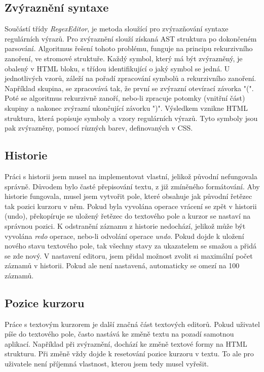 \subsection*{Zvýraznění syntaxe}

Součástí třídy \textit{RegexEditor}, je metoda sloužící pro zvýrazňování syntaxe regulárních výrazů. 
Pro zvýraznění slouží získaná AST struktura po dokončeném parsování.
Algoritmus řešení tohoto problému, funguje na principu rekurzivního zanoření, ve stromové struktuře.
Každý symbol, který má být zvýrazněný, je obalený v HTML bloku, s třídou identifikující o jaký symbol se jedná.
U jednotlivých vzorů, záleží na pořadí zpracování symbolů a rekurzivního zanoření.
Například skupina, se zpracovává tak, že první se zvýrazní otevírací závorka "(".
Poté se algoritmus rekurzivně zanoří, nebo-li zpracuje potomky (vnitřní část) skupiny a nakonec zvýrazní ukončující závorku ")".
Výsledkem vznikne HTML struktura, která popisuje symboly a vzory regulárních výrazů.
Tyto symboly jsou pak zvýrazněny, pomocí různých barev, definovaných v CSS.

\subsection*{Historie}
Práci s historii jsem musel na implementovat vlastní, jelikož původní nefungovala správně.
Důvodem bylo časté přepisování textu, z již zmíněného formátování.
Aby historie fungovala, musel jsem vytvořit pole, které obsahuje jak původní řetězec tak pozici kurzoru v něm.
Pokud byla vyvolána operace vrácení se zpět v historii (undo), překopíruje se uložený řetězec do textového pole a kurzor se nastaví na správnou pozici.
K odstranění záznamu z historie nedochází, jelikož může být vyvolána \textit{redo} operace, nebo-li odvolání operace \textit{undo}.
Pokud dojde k uložení nového stavu textového pole, tak všechny stavy za ukazatelem se smažou a přidá se zde nový.
V nastavení editoru, jsem přidal možnost zvolit si maximální počet záznamů v historii.
Pokud ale není nastavená, automaticky se omezí na 100 záznamů.

\subsection*{Pozice kurzoru}
Práce s textovým kurzorem je další značná část textových editorů.
Pokud uživatel píše do textového pole, často nastává ke změně textu na pozadí samotnou aplikací.
Například při zvýraznění, dochází ke změně textové formy na HTML strukturu.
Při změně vždy dojde k resetování pozice kurzoru v textu.
To ale pro uživatele není příjemná vlastnost, kterou jsem tedy musel vyřešit.

